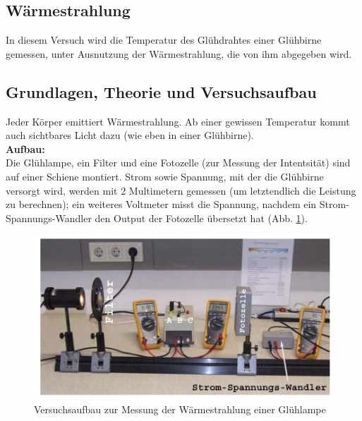 \documentclass[12pt,a4paper]{article}
\begin{document}
\begin{multicols}{2}
\section{Wärmestrahlung}

In diesem Versuch wird die Temperatur des Glühdrahtes einer Glühbirne gemessen, unter Ausnutzung der Wärmestrahlung, die von ihm abgegeben wird.

\subsection{Grundlagen, Theorie und Versuchsaufbau}

Jeder Körper emittiert Wärmestrahlung. Ab einer gewissen Temperatur kommt auch sichtbares Licht dazu (wie eben in einer Glühbirne).\\

\textbf{Aufbau:}\\
Die Glühlampe, ein Filter und eine Fotozelle (zur Messung der Intentsität) sind auf einer Schiene montiert. Strom sowie Spannung, mit der die Glühbirne versorgt wird, werden mit 2 Multimetern gemessen (um letztendlich die Leistung zu berechnen); ein weiteres Voltmeter misst die Spannung, nachdem ein Strom-Spannungs-Wandler den Output der Fotozelle übersetzt hat (Abb. \ref{fig:waermestrahlung_aufbau}).




\end{multicols}
\begin{figure}[H]
	\centering
	\includegraphics[scale=0.9]{./data/waermestrahlung_aufbau.png}
	\caption{Versuchsaufbau zur Messung der Wärmestrahlung einer Glühlampe}
	\label{fig:waermestrahlung_aufbau}
\end{figure}
\end{document}
